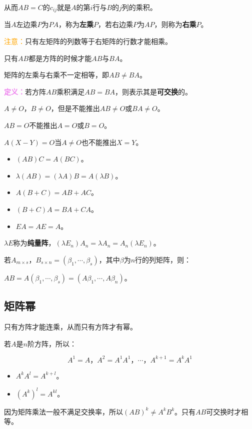 \documentclass[UTF8, 12pt]{ctexart}
\begin{document}
从而$AB=C$的$c_{ij}$就是$A$的第$i$行与$B$的$j$列的乘积。

当$A$左边乘$P$为$PA$，称为\textbf{左乘}$P$，若右边乘$P$为$AP$，则称为\textbf{右乘}$P$。

\textcolor{orange}{注意：}只有左矩阵的列数等于右矩阵的行数才能相乘。

只有$AB$都是方阵的时候才能$AB$与$BA$。

矩阵的左乘与右乘不一定相等，即$AB\neq BA$。

\textcolor{violet}{\textbf{定义：}}若方阵$AB$乘积满足$AB=BA$，则表示其是\textbf{可交换}的。

$A\neq O$，$B\neq O$，但是不能推出$AB\neq O$或$BA\neq O$。

$AB=O$不能推出$A=O$或$B=O$。

$A(X-Y)=O$当$A\neq O$也不能推出$X=Y$。

\begin{itemize}
    \item $(AB)C=A(BC)$。
    \item $\lambda(AB)=(\lambda A)B=A(\lambda B)$。
    \item $A(B+C)=AB+AC$。
    \item $(B+C)A=BA+CA$。
    \item $EA=AE=A$。
\end{itemize}

$\lambda E$称为\textbf{纯量阵}，$(\lambda E_n)A_n=\lambda A_n=A_n(\lambda E_n)$。

若$A_{m\times s}$，$B_{s\times n}=(\beta_1,\cdots,\beta_s)$，其中$\beta$为$n$行的列矩阵，则：

$AB=A(\beta_1,\cdots,\beta_s)=(A\beta_1,\cdots,A\beta_n)$。

\subsection{矩阵幂}

只有方阵才能连乘，从而只有方阵才有幂。

若$A$是$n$阶方阵，所以：

$$A^1=A\text{，}A^2=A^1A^1\text{，}\cdots\text{，}A^{k+1}=A^kA^1$$

\begin{itemize}
    \item $A^kA^l=A^{k+l}$。
    \item $(A^k)^l=A^{kl}$。
\end{itemize}

因为矩阵乘法一般不满足交换率，所以$(AB)^k\neq A^kB^k$。只有$AB$可交换时才相等。
\end{document}
